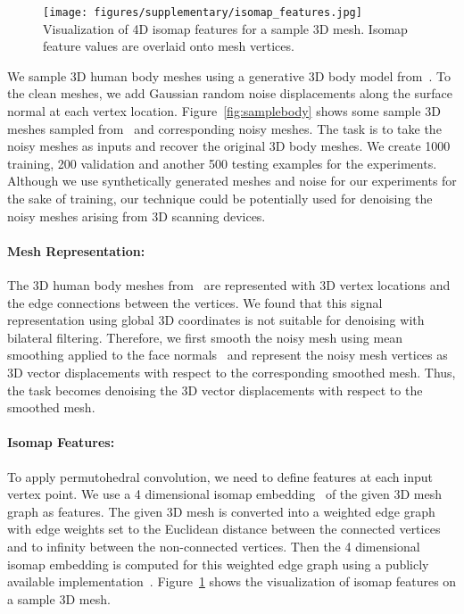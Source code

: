 \begin{figure}[t!]
  \centering
    \texttt{[image: figures/supplementary/isomap\_features.jpg]}
  {Visualization of 4D isomap features for a sample 3D mesh. Isomap feature values are overlaid onto mesh vertices.}
  \label{fig:isomap}
\end{figure}

We sample 3D human body meshes using a
generative 3D body model from~\cite{SMPL:2015}. To the clean meshes, we add Gaussian random
noise displacements along the surface normal at each vertex location.
Figure~\ref{fig:samplebody} shows some sample 3D meshes sampled
from~\cite{SMPL:2015} and corresponding noisy meshes. The task is to take the noisy meshes as inputs and
recover the original 3D body meshes. We create 1000 training, 200 validation and another 500
testing examples for the experiments. Although we use synthetically generated meshes and noise for
our experiments for the sake of training, our technique could be potentially used for
denoising the noisy meshes arising from 3D scanning devices.

\paragraph{Mesh Representation:} The 3D human body meshes from~\cite{SMPL:2015} are represented with
3D vertex locations and the edge connections between the vertices. We found that this signal representation
using global 3D coordinates is not suitable for denoising with bilateral filtering. Therefore, we first
smooth the noisy mesh using mean smoothing applied to the face normals~\cite{yagou2002mesh} and represent the noisy
mesh vertices as 3D vector displacements with respect to the corresponding smoothed mesh. Thus, the
task becomes denoising the 3D vector displacements with respect to the smoothed mesh.

\paragraph{Isomap Features:} To apply permutohedral convolution, we need to define features at each input
vertex point. We use a 4 dimensional isomap embedding~\cite{tenenbaum2000global} of the given 3D mesh graph as features. The
given 3D mesh is converted into a weighted edge graph with edge weights set to the Euclidean distance between the
connected vertices and to infinity between the non-connected vertices. Then the 4 dimensional isomap embedding is
computed for this weighted edge graph using a publicly available implementation~\cite{isomap_code}.
Figure~\ref{fig:isomap} shows the visualization of isomap features on a sample 3D mesh.

